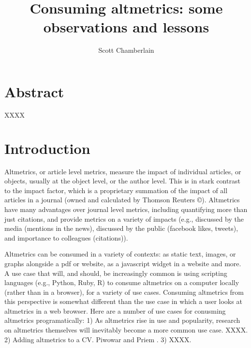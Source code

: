\documentclass[letterpaper,superscriptaddress,showkeys,longbibliography]{revtex4-1}\usepackage{graphicx, color}
\begin{document}

\title{Consuming altmetrics: some observations and lessons}

\author{Scott Chamberlain}


\maketitle

\section*{Abstract}

XXXX

\section*{Introduction}

Altmetrics, or article level metrics, measure the impact of individual articles, or objects, usually at the object level, or the author level. This is in stark contrast to the impact factor, which is a proprietary summation of the impact of all articles in a journal (owned and calculated by Thomson Reuters ©). Altmetrics have many advantages over journal level metrics, including quantifying more than just citations, and provide metrics on a variety of impacts (e.g., discussed by the media (mentions in the news), discussed by the public (facebook likes, tweets), and importance to colleagues (citations)). 

Altmetrics can be consumed in a variety of contexts: as static text, images, or graphs alongside a pdf or website, as a javascript widget in a website and more. A use case that will, and should, be increasingly common is using scripting languages (e.g., Python, Ruby, R) to consume altmetrics on a computer locally (rather than in a browser), for a variety of use cases. Consuming altmetrics from this perspective is somewhat different than the use case in which a user looks at altmetrics in a web browser. Here are a number of use cases for conusming altmetrics programatically: 1) As altmetrics rise in use and popularity, research on altmetrics themselves will inevitably become a more common use case. XXXX. 2) Adding altmetrics to a CV. Piwowar and Priem \cite{piwowar2013power}. 3) XXXX. 
\end{document}
